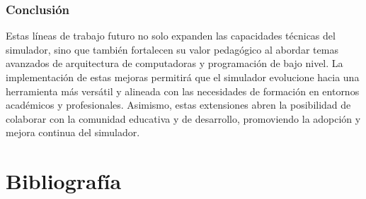 \documentclass[12pt,oneside]{templates/unerthesis}
\begin{document}
\hypertarget{conclusiuxf3n-1}{%
\subsection{Conclusión}\label{conclusiuxf3n-1}}

Estas líneas de trabajo futuro no solo expanden las capacidades técnicas del simulador, sino que también fortalecen su valor pedagógico al abordar temas avanzados de arquitectura de computadoras y programación de bajo nivel. La implementación de estas mejoras permitirá que el simulador evolucione hacia una herramienta más versátil y alineada con las necesidades de formación en entornos académicos y profesionales. Asimismo, estas extensiones abren la posibilidad de colaborar con la comunidad educativa y de desarrollo, promoviendo la adopción y mejora continua del simulador.

\hypertarget{Biblio}{%
\chapter{Bibliografía}\label{Biblio}}
\end{document}
